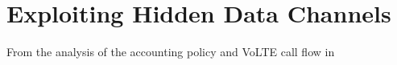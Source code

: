 
\chapter{Exploiting Hidden Data Channels}
\label{sec:accounting}

From the analysis of the accounting policy and VoLTE call flow in
